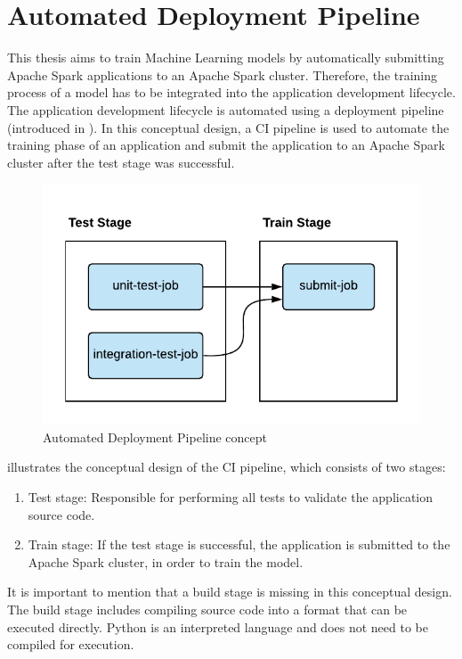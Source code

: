 \section{Automated Deployment Pipeline}
\label{sec:05_pipeline}
This thesis aims to train Machine Learning models by automatically submitting Apache Spark applications to an Apache Spark cluster. Therefore, the training process of a model has to be integrated into the application development lifecycle.
%
The application development lifecycle is automated using a deployment pipeline (introduced in ).
%
In this conceptual design, a CI pipeline is used to automate the training phase of an application and submit the application to an Apache Spark cluster after the test stage was successful.


\begin{figure}[h]
\centering
\includegraphics[scale=1]{images/05_conceptual_design/automated_deployment_pipeline/ci_cd_concept}
\caption{Automated Deployment Pipeline concept}
\label{fig:05_deployment_concept}
\end{figure}
 illustrates the conceptual design of the CI pipeline, which consists of two stages:
\begin{enumerate}
\item Test stage: Responsible for performing all tests to validate the application source code.
\item Train stage: If the test stage is successful, the application is submitted to the Apache Spark cluster, in order to train the model.
\end{enumerate}
It is important to mention that a build stage is missing in this conceptual design. The build stage includes compiling source code into a format that can be executed directly.
Python is an interpreted language and does not need to be compiled for execution.



